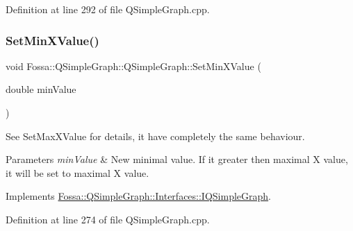 Definition at line 292 of file Q\+Simple\+Graph.\+cpp.

\mbox{\label{class_fossa_1_1_q_simple_graph_1_1_q_simple_graph_a0eef21e58d8c85f6083d73857f871639}} 
\subsubsection{\texorpdfstring{Set\+Min\+X\+Value()}{SetMinXValue()}}
{\footnotesize\ttfamily void Fossa\+::\+Q\+Simple\+Graph\+::\+Q\+Simple\+Graph\+::\+Set\+Min\+X\+Value (\begin{DoxyParamCaption}\item[{double}]{min\+Value }\end{DoxyParamCaption})\hspace{0.3cm}{\ttfamily [virtual]}}



See Set\+Max\+X\+Value for details, it have completely the same behaviour. 


\begin{DoxyParams}{Parameters}
{\em min\+Value} & New minimal value. If it greater then maximal X value, it will be set to maximal X value. \\
\hline
\end{DoxyParams}


Implements \hyperlink{class_fossa_1_1_q_simple_graph_1_1_interfaces_1_1_i_q_simple_graph_a4266725f87b306e572ad1ae37cfab4ef}{Fossa\+::\+Q\+Simple\+Graph\+::\+Interfaces\+::\+I\+Q\+Simple\+Graph}.



Definition at line 274 of file Q\+Simple\+Graph.\+cpp.

\mbox{\label{class_fossa_1_1_q_simple_graph_1_1_q_simple_graph_a8bf9aac5856a659eb89abffca7750df0}} 
